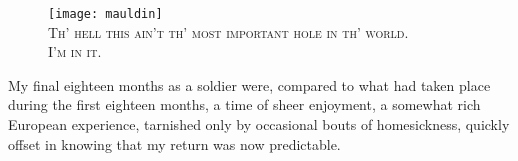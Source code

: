 \documentclass[../m3y-print]{subfiles}
\begin{document}
\begin{figure}[t]
\centering
\texttt{[image: mauldin]}\\
\medskip
{\newtimes\textsc{Th' hell this ain't th' most important hole in th' world.\\I'm in it.}}
\end{figure}

My final eighteen months as a soldier were, compared to what had taken place during the first eighteen months, a time of sheer enjoyment, a somewhat rich European experience, tarnished only by occasional bouts of homesickness, quickly offset in knowing that my return was now predictable.
\end{document}
